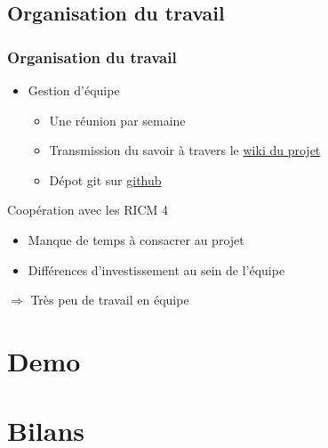 \documentclass{beamer}
\begin{document}
		\subsection{Organisation du travail}
			\begin{frame}
			  \frametitle{Organisation du travail}
			  \begin{itemize}
			    \item Gestion d'équipe
			    \begin{itemize}
			      \item Une réunion par semaine
			      \item Transmission du savoir à travers le \href{http://air.imag.fr/mediawiki/index.php/Proj-2012-2013-OAR-Cloud}{wiki du projet}
			      \item Dépot git sur \href{https://github.com/mickours/oar-cloud}{github}
			    \end{itemize}
			  \end{itemize}
			  \begin{alertblock}{Coopération avec les RICM 4}
			    \begin{itemize}
			      \item Manque de temps à consacrer au projet
			      \item Différences d'investissement au sein de l'équipe
			    \end{itemize}
			    $\Rightarrow$ Très peu de travail en équipe
			  \end{alertblock}
			\end{frame}
		
	\section{Demo}
	
	\section{Bilans}
\end{document}
